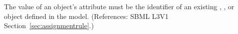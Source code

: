 The value of an \AssignmentRule object's  attribute must be
the identifier of an existing \Compartment, \Species, \Parameter or
\SpeciesReference object defined in the model.  (References: SBML L3V1
Section~\ref{sec:assignmentrule}.)
